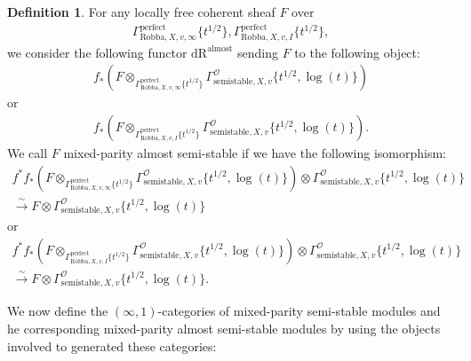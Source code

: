 \documentclass[12pt]{book}
\theoremstyle{definition}
\newtheorem{definition}{Definition}
\begin{document}
\begin{definition}
For any locally free coherent sheaf $F$ over
\begin{align}
\Gamma^\mathrm{perfect}_{\text{Robba},X,v,\infty}\{t^{1/2}\},\Gamma^\mathrm{perfect}_{\text{Robba},X,v,I}\{t^{1/2}\},
\end{align} 
we consider the following functor $\mathrm{dR}^\mathrm{almost}$ sending $F$ to the following object:
\begin{align}
f_*(F\otimes_{\Gamma^\mathrm{perfect}_{\text{Robba},X,v,\infty}\{t^{1/2}\}} \Gamma^\mathcal{O}_{\text{semistable},X,v}\{t^{1/2},\log(t)\})
\end{align}
or 
\begin{align}
f_*(F\otimes_{\Gamma^\mathrm{perfect}_{\text{Robba},X,v,I}\{t^{1/2}\}} \Gamma^\mathcal{O}_{\text{semistable},X,v}\{t^{1/2},\log(t)\}).
\end{align}
We call $F$ mixed-parity almost semi-stable if we have the following isomorphism:
\begin{align}
f^*f_*(F\otimes_{\Gamma^\mathrm{perfect}_{\text{Robba},X,v,\infty}\{t^{1/2}\}} \Gamma^\mathcal{O}_{\text{semistable},X,v}\{t^{1/2},\log(t)\}) \otimes \Gamma^\mathcal{O}_{\text{semistable},X,v}\{t^{1/2},\log(t)\} \\
\overset{\sim}{\longrightarrow} F \otimes \Gamma^\mathcal{O}_{\text{semistable},X,v}\{t^{1/2},\log(t)\} 
\end{align}
or 
\begin{align}
f^*f_*(F\otimes_{\Gamma^\mathrm{perfect}_{\text{Robba},X,v,I}\{t^{1/2}\}} \Gamma^\mathcal{O}_{\text{semistable},X,v}\{t^{1/2},\log(t)\}) \otimes \Gamma^\mathcal{O}_{\text{semistable},X,v}\{t^{1/2},\log(t)\}\\ \overset{\sim}{\longrightarrow} F \otimes \Gamma^\mathcal{O}_{\text{semistable},X,v}\{t^{1/2},\log(t)\}. 
\end{align}
\end{definition}

\noindent We now define the $(\infty,1)$-categories of mixed-parity semi-stable modules and he corresponding mixed-parity almost semi-stable modules by using the objects involved to generated these categories:
\end{document}
